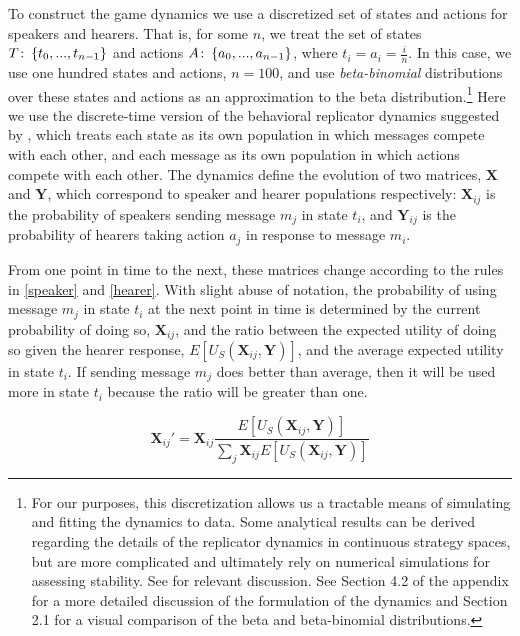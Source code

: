 \documentclass[linguex]{sp}
\theoremstyle{definition} \newtheorem{definition}{Definition}
\begin{document}
To construct the game dynamics we use a discretized set of states and actions for speakers and hearers. That is, for some $n$, we treat the set of states $T \colon\thinspace \{t_0, ..., t_{n-1} \}$ and actions $A \colon\thinspace \{a_0, ..., a_{n-1} \}$, where $t_i = a_i = \frac{i}{n}$. In this case, we use one hundred states and actions, $n=100$, and use \emph{beta-binomial} distributions over these states and actions as an approximation to the beta distribution.\footnote{For our purposes, this discretization allows us a tractable means of simulating and fitting the dynamics to data. Some analytical results can be derived regarding the  details of the replicator dynamics in continuous strategy spaces, but are more complicated  and ultimately rely on numerical simulations for assessing stability. See  \cite{oechssler2002,jager2011} for relevant discussion. See Section 4.2 of the appendix for a more detailed discussion of the formulation of the dynamics and Section 2.1 for a visual comparison of the beta and beta-binomial distributions.} Here we use the discrete-time version of the behavioral replicator dynamics suggested by \cite{hofbauer-huttegger2015}, which treats each state as its own population in which messages compete with each other, and each message as its own population in which actions compete with each other.  The dynamics define the evolution of two matrices, $\mathbf{X}$  and $\mathbf{Y}$,  which correspond to speaker and hearer populations respectively: $\mathbf{X}_{ij}$ is the probability of speakers sending message $m_j$ in state $t_i$, and $\mathbf{Y}_{ij}$ is the probability of hearers taking action $a_j$ in response to message $m_i$.

From one point in time to the next, these matrices change according to the rules in \eqref{speaker} and \eqref{hearer}. With slight abuse of notation, the probability of using message $m_j$ in state $t_i$ at the next point in time is determined by the current probability of doing so, $\mathbf{X}_{ij}$, and the ratio between the expected utility of doing so given the hearer response, $E[U_S(\mathbf{X}_{ij}, \mathbf{Y})]$, and the average expected utility in state $t_i$. If sending message $m_j$ does better than average, then it will be used more in state $t_i$ because the ratio will be greater than one.

\begin{equation}
     \mathbf{X}_{ij}' = \mathbf{X}_{ij}\frac{E[U_S(\mathbf{X}_{ij}, \mathbf{Y})]}{\sum_j \mathbf{X}_{ij} E[U_S(\mathbf{X}_{ij}, \mathbf{Y})]}
     \label{speaker}
\end{equation}
\end{document}
